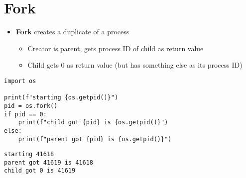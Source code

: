 \documentclass[krantzl]{krantz}
\newcommand{\glossref}[1]{\textbf{#1}}
\begin{document}
\section{Fork}
\begin{itemize}
\item \glossref{Fork} creates a duplicate of a process\begin{itemize}
\item Creator is parent, gets process ID of child as return value

\item Child gets 0 as return value (but has something else as its process ID)

\end{itemize}


\end{itemize}
\begin{lstlisting}[frame=tblr]
import os

print(f"starting {os.getpid()}")
pid = os.fork()
if pid == 0:
    print(f"child got {pid} is {os.getpid()}")
else:
    print(f"parent got {pid} is {os.getpid()}")
\end{lstlisting}

\begin{lstlisting}[frame=tblr,backgroundcolor=\color{black!5}]
starting 41618
parent got 41619 is 41618
child got 0 is 41619
\end{lstlisting}
\end{document}
